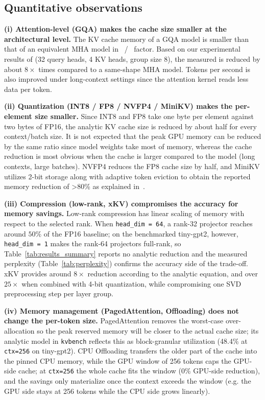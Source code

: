 \documentclass[conference]{IEEEtran}
\begin{document}
\subsection{Quantitative observations}

\textbf{(i) Attention-level (GQA) makes the cache size smaller at the architectural level.} The KV cache memory of a GQA model is smaller than that of an equivalent MHA model in ~/~ factor. Based on our experimental results of  (32 query heads, 4 KV heads, group size 8), the measured  is reduced by about $8\times$ times compared to a same-shape MHA model. Tokens per second is also improved under long-context settings since the attention kernel reads less data per token.

\textbf{(ii) Quantization (INT8 / FP8 / NVFP4 / MiniKV) makes the per-element size smaller.} Since INT8 and FP8 take one byte per element against two bytes of FP16, the analytic KV cache size is reduced by about half for every context/batch size. It is not expected that the peak GPU memory can be reduced by the same ratio since model weights take most of memory, whereas the cache reduction is most obvious when the cache is larger compared to the model (long contexts, large batches). NVFP4 reduces the FP8 cache size by half, and MiniKV utilizes 2-bit storage along with adaptive token eviction to obtain the reported memory reduction of >80\% as explained in~\cite{sharma2025minikv}.

\textbf{(iii) Compression (low-rank, xKV) compromises the accuracy for memory savings.} Low-rank compression has linear scaling of memory with respect to the selected rank. When \texttt{head\_dim = 64}, a rank-32 projector reaches around $50\%$ of the FP16 baseline; on the benchmarked tiny-gpt2, however, \texttt{head\_dim = 1} makes the rank-64 projectors full-rank, so Table~\ref{tab:results_summary} reports no analytic reduction and the measured perplexity (Table~\ref{tab:perplexity}) confirms the accuracy side of the trade-off. xKV provides around $8\times$ reduction according to the analytic equation, and over $25\times$ when combined with 4-bit quantization, while compromising one SVD preprocessing step per layer group.

\textbf{(iv) Memory management (PagedAttention, Offloading) does not change the per-token size.} PagedAttention removes the worst-case over-allocation so the peak reserved memory will be closer to the actual cache size; its analytic model in \texttt{kvbench} reflects this as block-granular utilization (48.4\% at \texttt{ctx=256} on tiny-gpt2). CPU Offloading transfers the older part of the cache into the pinned CPU memory, while the GPU window of 256 tokens caps the GPU-side cache; at \texttt{ctx=256} the whole cache fits the window (0\% GPU-side reduction), and the savings only materialize once the context exceeds the window (e.g. the GPU side stays at 256 tokens while the CPU side grows linearly).
\end{document}
